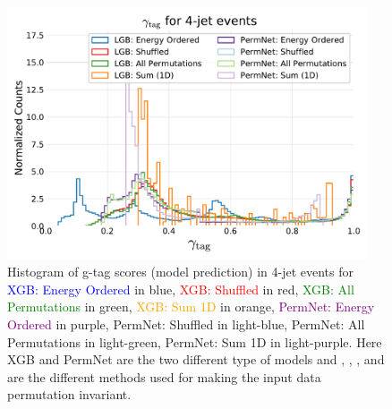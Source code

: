 \begin{figure}
  \includegraphics[width=0.95\textwidth, trim=10 10 10 40, clip]{figures/quarks/gtag_y_pred_4_jet_hist-down_sample=1.00-ML_vars=vertex-selection=b-ejet_min=4-n_iter_RS_lgb=99-n_iter_RS_xgb=9-cdot_cut=0.90-version=19.pdf}
  \caption[g-tag scores in 4-jet events]
          {
            Histogram of g-tag scores (model prediction) in 4-jet events for \textcolor{blue}{XGB: Energy Ordered} in blue, \textcolor{red}{XGB: Shuffled} in red, \textcolor{green}{XGB: All Permutations} in green, \textcolor{orange}{XGB: Sum 1D} in orange, \textcolor{purple}{PermNet: Energy Ordered} in purple, \textcolor{light-blue}{PermNet: Shuffled} in light-blue, \textcolor{light-green}{PermNet: All Permutations} in light-green, \textcolor{light-purple}{PermNet: Sum 1D} in light-purple.  Here XGB and PermNet are the two different type of models and , , , and  are the different methods used for making the input data permutation invariant.  
          }   
  \label{fig:q:gtag_scores_4j}
\end{figure}


